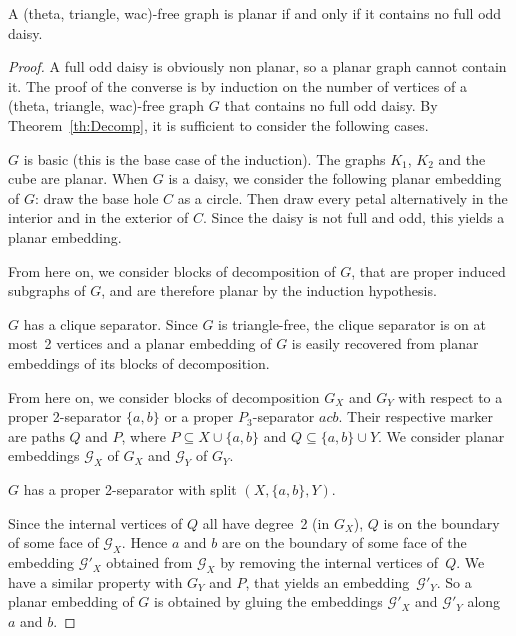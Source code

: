 \documentclass[11pt]{article}
\begin{document}
\begin{theo}
  \label{th:planar}
  A (theta, triangle, wac)-free graph is planar if and only if it contains no full odd daisy. 
\end{theo}

\begin{proof}
  A full odd daisy is obviously non planar, so a planar graph cannot contain it. The proof of the converse is by induction on the number of vertices of a (theta, triangle, wac)-free graph $G$ that contains no full odd daisy. By Theorem~\ref{th:Decomp}, it is sufficient to consider the following cases. 

  \medskip

   $G$ is basic (this is the base case of the induction).
  The graphs $K_1$, $K_2$ and the cube are planar. 
  When $G$ is a daisy, we consider the following planar embedding of $G$: draw the base hole $C$ as a circle. 
  Then draw every petal alternatively in the interior and in the exterior of $C$. 
  Since the daisy is not full and odd, this yields a planar embedding. 

  \medskip
  
  From here on, we consider blocks of decomposition of $G$, that are proper induced subgraphs of $G$, and are therefore planar by the induction hypothesis. 
  
  \medskip

   $G$ has a clique separator.
  Since $G$ is triangle-free, the clique separator is on at most~2 vertices and a planar embedding of $G$ is easily recovered from planar embeddings of its blocks of decomposition. 
  
  \medskip
  
  From here on, we consider blocks of decomposition $G_X$ and $G_Y$ with respect to a proper 2-separator $\{a, b\}$ or a proper $P_3$-separator $acb$. 
  Their respective marker are paths $Q$ and $P$, where $P\subseteq X \cup \{a, b\}$ and $Q\subseteq \{a, b\} \cup Y$.  
  We consider planar embeddings $\mathcal G_X$ of $G_X$ and $\mathcal G_Y$ of $G_Y$.
  
  \medskip
  
   $G$ has a proper 2-separator with split $(X, \{a, b\}, Y)$. 
  
  Since the internal vertices of $Q$ all have degree~2 (in $G_X$), $Q$ is on the boundary of some face of $\mathcal G_X$.  
  Hence $a$ and $b$ are on the boundary of some face of the embedding $\mathcal G'_X$  obtained from $\mathcal G_X$ by removing the internal vertices of~$Q$.  
  We have a similar property with $G_Y$ and $P$, that yields an embedding~$\mathcal G'_Y$. 
  So a planar embedding of $G$ is obtained by gluing the embeddings $\mathcal G'_X$ and $\mathcal G'_Y$ along $a$ and $b$. 
  

\end{proof}
\end{document}
